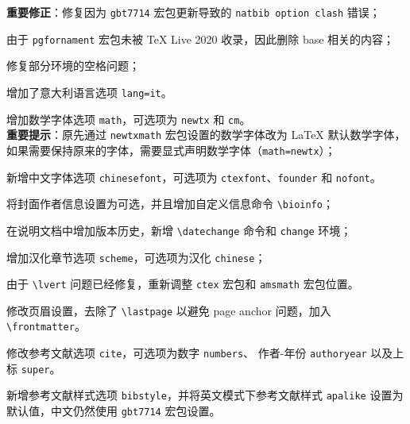 \documentclass[lang=cn,10pt,cite=super]{elegantbook}
\begin{document}

\begin{change}
  \item \textbf{重要修正}：修复因为 \lstinline{gbt7714} 宏包更新导致的 \lstinline{natbib option clash} 错误；
  \item 由于 \lstinline{pgfornament} 宏包未被 \TeX{} Live 2020 收录，因此删除 base 相关的内容；
  \item 修复部分环境的空格问题；
  \item 增加了意大利语言选项 \lstinline{lang=it}。
\end{change}



\begin{change}
  \item 增加数学字体选项 \lstinline{math}，可选项为 \lstinline{newtx} 和 \lstinline{cm}。\\
  \textbf{重要提示}：原先通过 \lstinline{newtxmath} 宏包设置的数学字体改为 \LaTeX{} 默认数学字体，如果需要保持原来的字体，需要显式声明数学字体（\lstinline{math=newtx}）；
  \item 新增中文字体选项 \lstinline{chinesefont}，可选项为 \lstinline{ctexfont}、\lstinline{founder} 和 \lstinline{nofont}。
  \item 将封面作者信息设置为可选，并且增加自定义信息命令 \lstinline{\bioinfo}；
  \item 在说明文档中增加版本历史，新增 \lstinline{\datechange} 命令和 \lstinline{change} 环境；
  \item 增加汉化章节选项 \lstinline{scheme}，可选项为汉化 \lstinline{chinese}；
  \item 由于 \lstinline{\lvert} 问题已经修复，重新调整 \lstinline{ctex} 宏包和 \lstinline{amsmath} 宏包位置。
  \item 修改页眉设置，去除了 \lstinline{\lastpage} 以避免 page anchor 问题，加入 \lstinline{\frontmatter}。
  \item 修改参考文献选项 \lstinline{cite}，可选项为数字 \lstinline{numbers}、 作者-年份 \lstinline{authoryear} 以及上标 \lstinline{super}。
  \item 新增参考文献样式选项 \lstinline{bibstyle}，并将英文模式下参考文献样式 \lstinline{apalike} 设置为默认值，中文仍然使用 \lstinline{gbt7714} 宏包设置。
\end{change}

\end{document}
